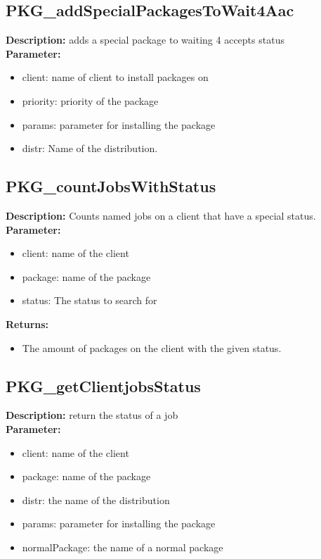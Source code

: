 \subsection{PKG\_addSpecialPackagesToWait4Aac}
\textbf{Description:} adds a special package to waiting 4 accepts status\\
\textbf{Parameter:}
\begin{itemize}
\item client: name of client to install packages on
\item priority: priority of the package
\item params: parameter for installing the package
\item distr: Name of the distribution.
\end{itemize}

\subsection{PKG\_countJobsWithStatus}
\textbf{Description:} Counts named jobs on a client that have a special status.\\
\textbf{Parameter:}
\begin{itemize}
\item client: name of the client
\item package: name of the package
\item status: The status to search for
\end{itemize}
\textbf{Returns:}
\begin{itemize}
\item The amount of packages on the client with the given status.
\end{itemize}

\subsection{PKG\_getClientjobsStatus}
\textbf{Description:} return the status of a job\\
\textbf{Parameter:}
\begin{itemize}
\item client: name of the client
\item package: name of the package
\item distr: the name of the distribution
\item params: parameter for installing the package
\item normalPackage: the name of a normal package
\end{itemize}

